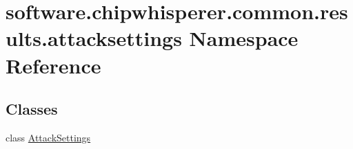 \hypertarget{namespacesoftware_1_1chipwhisperer_1_1common_1_1results_1_1attacksettings}{}\section{software.\+chipwhisperer.\+common.\+results.\+attacksettings Namespace Reference}
\label{namespacesoftware_1_1chipwhisperer_1_1common_1_1results_1_1attacksettings}
\subsection*{Classes}
\begin{DoxyCompactItemize}
\item 
class \hyperlink{classsoftware_1_1chipwhisperer_1_1common_1_1results_1_1attacksettings_1_1AttackSettings}{Attack\+Settings}
\end{DoxyCompactItemize}
